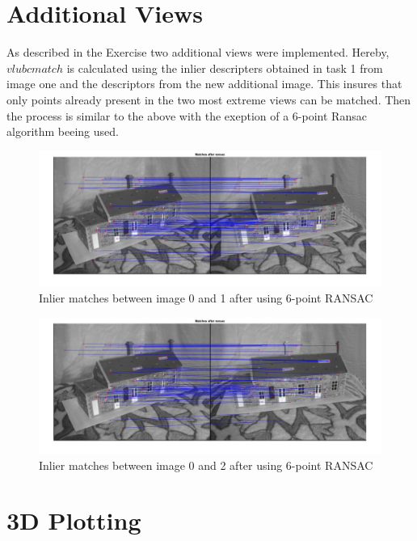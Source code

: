\documentclass[12pt]{article}
\begin{document}
\section{Additional Views}

As described in the Exercise two additional views were implemented. Hereby, $vl ubcmatch$ is calculated using the inlier descripters obtained in task 1 from image one and the descriptors from the new additional image. This insures that only points already present in the two most extreme views can be matched. Then the process is similar to the above with the exeption of a 6-point Ransac algorithm beeing used. 

\vspace{5mm}
\begin{figure}[H]
	\centering
	\includegraphics[width=1.1\textwidth]{3.jpg}
	\caption{Inlier matches between image 0 and 1 after using 6-point RANSAC}
	\label{fig1}
\end{figure}
\vspace{5mm}
\begin{figure}[H]
	\centering
	\includegraphics[width=1.1\textwidth]{4.jpg}
	\caption{Inlier matches between image 0 and 2 after using 6-point RANSAC}
	\label{fig1}
\end{figure}
\vspace{5mm}


\section{3D Plotting}
\end{document}
